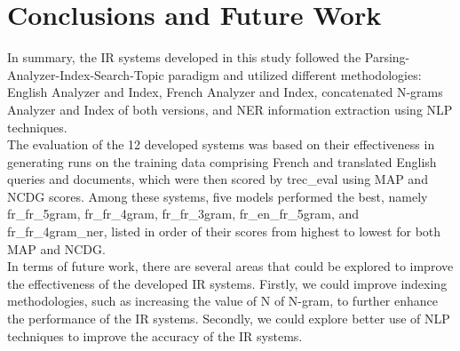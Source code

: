 \section{Conclusions and Future Work}
\label{sec:conclusion}

In summary, the IR systems developed in this study followed the Parsing-Analyzer-Index-Search-Topic paradigm and utilized different methodologies: English Analyzer and Index, French Analyzer and Index, 
concatenated N-grams Analyzer and Index of both versions, and NER information extraction using NLP techniques. \\
The evaluation of the 12 developed systems was based on their effectiveness in generating runs on the training data comprising French and translated English queries and documents, which were then scored by trec\_eval using MAP and NCDG scores. Among these systems, five models performed the best, namely fr\_fr\_5gram, fr\_fr\_4gram, fr\_fr\_3gram, fr\_en\_fr\_5gram, and fr\_fr\_4gram\_ner, listed in order of their scores from highest to lowest for both MAP and NCDG.\\
In terms of future work, there are several areas that could be explored to improve the effectiveness of the developed IR systems. Firstly, we could improve indexing methodologies, such as increasing the value of N of N-gram, to further enhance the performance of the IR systems. 
Secondly,  we could explore better use of NLP techniques to improve the accuracy of the IR systems. \\